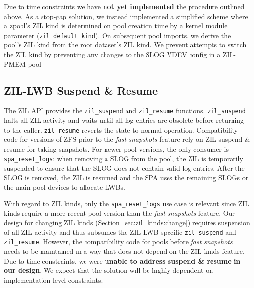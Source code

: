 \documentclass[12pt,a4paper,twoside]{book}
\begin{document}
Due to time constraints we have \textbf{not yet implemented} the procedure outlined above.
As a stop-gap solution, we instead implemented a simplified scheme where a zpool's ZIL kind is determined on pool creation time by a kernel module parameter (\lstinline{zil_default_kind}).
On subsequent pool imports, we derive the pool's ZIL kind from the root dataset's ZIL kind.
We prevent attempts to switch the ZIL kind by preventing any changes to the SLOG VDEV config in a ZIL-PMEM pool.


\subsection{ZIL-LWB Suspend \& Resume}\label{sec:zil_kinds:suspend_resume}
The ZIL API provides the \lstinline{zil_suspend} and \lstinline{zil_resume} functions.
\lstinline{zil_suspend} halts all ZIL activity and waits until all log entries are obsolete before returning to the caller.
\lstinline{zil_resume} reverts the state to normal operation.
Compatibility code for versions of ZFS prior to the \textit{fast snapshots} feature rely on ZIL suspend \& resume for taking snapshots.
For newer pool versions, the only consumer is \lstinline{spa_reset_logs}: when removing a SLOG from the pool, the ZIL is temporarily suspended to ensure that the SLOG does not contain valid log entries.
After the SLOG is removed, the ZIL is resumed and the SPA uses the remaining SLOGs or the main pool devices to allocate LWBs.

With regard to ZIL kinds, only the \lstinline{spa_reset_logs} use case is relevant since ZIL kinds require a more recent pool version than the \textit{fast snapshots} feature.
Our design for changing ZIL kinds (Section~\ref{sec:zil_kinds:change}) requires suspension of all ZIL activity and thus subsumes the ZIL-LWB-specific \lstinline{zil_suspend} and \lstinline{zil_resume}.
However, the compatibility code for pools before \textit{fast snapshots} needs to be maintained in a way that does not depend on the ZIL kinds feature.
Due to time constraints, we were \textbf{unable to address suspend \& resume in our design}.
We expect that the solution will be highly dependent on implementation-level constraints.
\end{document}
